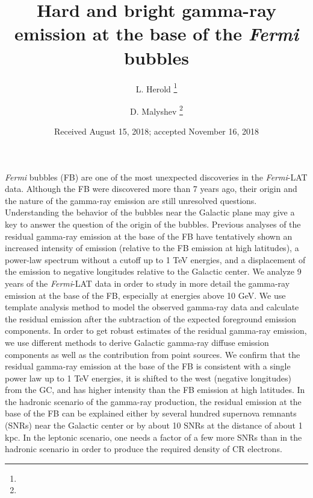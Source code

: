 \documentclass[onecolumn, 12pt]{aa}
\newcommand{\Fermi}{\textit{Fermi}\xspace}
\begin{document}
 


   \title{Hard and bright gamma-ray emission at the base of the \Fermi bubbles}



   \author{L. Herold \thanks{}
          \and
          D. Malyshev \thanks{}
          }


   \date{Received August 15, 2018; accepted November 16, 2018}

 
  \abstract
   {\Fermi bubbles (FB) are one of the most unexpected discoveries in the \Fermi-LAT data. 
   Although the FB were discovered more than 7 years ago, their origin and the nature of the gamma-ray emission are still unresolved questions.
   Understanding the behavior of the bubbles near the Galactic plane may give a key to answer the question of the origin of the bubbles.
   Previous analyses of the residual gamma-ray emission at the base of the FB have tentatively shown an increased intensity of emission
   (relative to the FB emission at high latitudes), a power-law spectrum without a cutoff up to 1 TeV energies, 
   and a displacement of the emission to negative longitudes relative to the Galactic center.
   }
   {We analyze 9 years of the \Fermi-LAT data in order to study in more detail the gamma-ray emission at the base of the FB,
   especially at energies above 10 GeV.
   }
   { We use template analysis method to model the observed gamma-ray data 
   and calculate the residual emission after the subtraction of the expected foreground emission components.
   In order to get robust estimates of the residual gamma-ray emission, 
   we use different methods to derive Galactic gamma-ray diffuse emission components as well as the contribution from point sources.
   }
   {We confirm that the residual gamma-ray emission at the base of the FB is consistent with a single power law up to 1 TeV energies,
   it is shifted to the west (negative longitudes) from the GC, and has higher intensity than the FB emission at high latitudes.
   In the hadronic scenario of the gamma-ray production,
   the residual emission at the base of the FB can be explained 
   either by several hundred supernova remnants (SNRs) near the Galactic center
   or by about 10 SNRs at the distance of about 1 kpc.
   In the leptonic scenario, one needs a factor of a few more SNRs than in the hadronic scenario in order to 
   produce the required density of CR electrons.
   }
   {}
\end{document}
